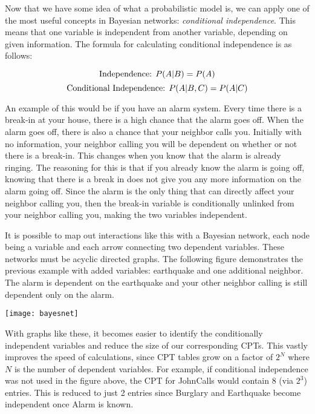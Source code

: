 Now that we have some idea of what a probabilistic model is, we can apply one of the most useful concepts in Bayesian networks: \textit{conditional independence}. This means that one variable is independent from another variable, depending on given information. The formula for calculating conditional independence is as follows:\par

\begin{equation}
  \textnormal{Independence: }
  P(A|B) = P(A)
\end{equation}
\begin{equation}
  \textnormal{Conditional Independence: }
  P(A|B,C) = P(A|C)
\end{equation}

An example of this would be if you have an alarm system. Every time there is a break-in at your house, there is a high chance that the alarm goes off. When the alarm goes off, there is also a chance that your neighbor calls you. Initially with no information, your neighbor calling you will be dependent on whether or not there is a break-in. This changes when you know that the alarm is already ringing. The reasoning for this is that if you already know the alarm is going off, knowing that there is a break in does not give you any more information on the alarm going off. Since the alarm is the only thing that can directly affect your neighbor calling you, then the break-in variable is conditionally unlinked from your neighbor calling you, making the two variables independent.\par
It is possible to map out interactions like this with a Bayesian network, each node being a variable and each arrow connecting two dependent variables. These networks must be acyclic directed graphs. The following figure demonstrates the previous example with added variables: earthquake and one additional neighbor. The alarm is dependent on the earthquake and your other neighbor calling is still dependent only on the alarm.\par

\begin{center}
  \texttt{[image: bayesnet]}
\end{center}

With graphs like these, it becomes easier to identify the conditionally independent variables and reduce the size of our corresponding CPT\textquotesingle s. This vastly improves the speed of calculations, since CPT tables grow on a factor of $2^N$ where $N$ is the number of dependent variables. For example, if conditional independence was not used in the figure above, the CPT for JohnCalls would contain 8 (via $2^3$) entries. This is reduced to just 2 entries since Burglary and Earthquake become independent once Alarm is known.
